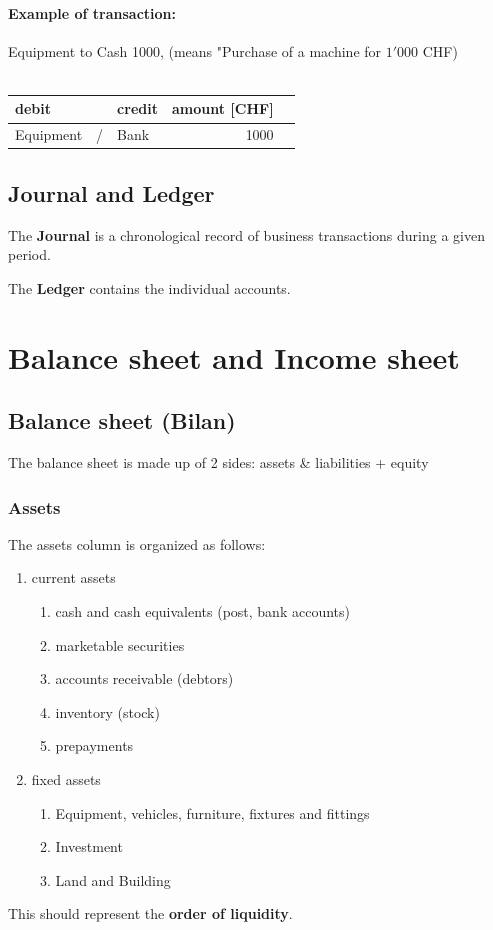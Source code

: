 \documentclass[a4paper] {scrartcl}
\begin{document}
\paragraph{Example of transaction:}
Equipment to Cash 1000, (means "Purchase of a machine for $1'000$ CHF)\\\\
\begin{tabular}{lllrl}
	\textbf{debit} & & \textbf{credit} & \textbf{amount} [CHF]&\\
	\hline
	Equipment & / & Bank & 1000&
\end{tabular}


\subsection{Journal and Ledger}
The \textbf{Journal} is a chronological record of business transactions during a given period.

The \textbf{Ledger} contains the individual accounts.


\section{Balance sheet and Income sheet}
\subsection{Balance sheet (Bilan)}
The balance sheet is made up of 2 sides: assets \& liabilities + equity
\subsubsection{Assets}
The assets column is organized as follows:


\begin{enumerate}
	\item current assets
	\begin{enumerate}
		\item cash and cash equivalents (post, bank accounts)
		\item marketable securities
		\item accounts receivable (debtors)
		\item inventory (stock)
		\item prepayments
	\end{enumerate}
	\item fixed assets
	\begin{enumerate}
		\item Equipment, vehicles, furniture, fixtures and fittings
		\item Investment
		\item Land and Building
	\end{enumerate}
\end{enumerate}
This should represent the \textbf{order of liquidity}.
\end{document}
